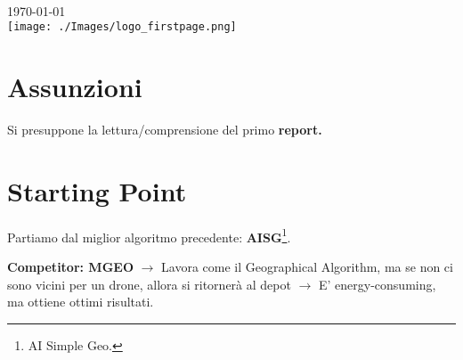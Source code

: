 \documentclass[12pt]{article}
\begin{document}
\begin{titlepage}
\begin{minipage}{0.4\textwidth}
\begin{flushright}
\end{flushright}
\end{minipage}\\[2cm]



{\large \today}\\[2cm] %


\texttt{[image: ./Images/logo\_firstpage.png]}\\[3cm] %
 

\vfill %


\end{titlepage}

\tableofcontents

\newpage

\section{Assunzioni}

Si presuppone la lettura/comprensione del primo \textbf{report.} 

\section{Starting Point}

Partiamo dal miglior algoritmo precedente: \textbf{AISG}\footnote{AI Simple Geo.}.

\textbf{Competitor: MGEO} $\rightarrow$ Lavora come il Geographical Algorithm, ma se non ci sono vicini per un drone, allora si ritornerà al depot $\rightarrow$ E' energy-consuming, ma ottiene ottimi risultati.
\end{document}
